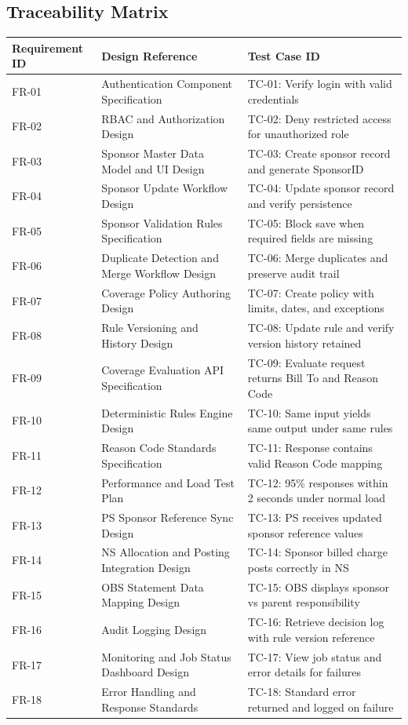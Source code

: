 \documentclass[12pt,a4paper]{article}
\begin{document}
\subsection{Traceability Matrix}
\begin{center}
\begin{tabular}{p{} p{} p{}}
\textbf{Requirement ID} & \textbf{Design Reference} & \textbf{Test Case ID} \\ \hline
FR-01 & Authentication Component Specification & TC-01: Verify login with valid credentials \\
FR-02 & RBAC and Authorization Design & TC-02: Deny restricted access for unauthorized role \\
FR-03 & Sponsor Master Data Model and UI Design & TC-03: Create sponsor record and generate SponsorID \\
FR-04 & Sponsor Update Workflow Design & TC-04: Update sponsor record and verify persistence \\
FR-05 & Sponsor Validation Rules Specification & TC-05: Block save when required fields are missing \\
FR-06 & Duplicate Detection and Merge Workflow Design & TC-06: Merge duplicates and preserve audit trail \\
FR-07 & Coverage Policy Authoring Design & TC-07: Create policy with limits, dates, and exceptions \\
FR-08 & Rule Versioning and History Design & TC-08: Update rule and verify version history retained \\
FR-09 & Coverage Evaluation API Specification & TC-09: Evaluate request returns Bill To and Reason Code \\
FR-10 & Deterministic Rules Engine Design & TC-10: Same input yields same output under same rules \\
FR-11 & Reason Code Standards Specification & TC-11: Response contains valid Reason Code mapping \\
FR-12 & Performance and Load Test Plan & TC-12: 95\% responses within 2 seconds under normal load \\
FR-13 & PS Sponsor Reference Sync Design & TC-13: PS receives updated sponsor reference values \\
FR-14 & NS Allocation and Posting Integration Design & TC-14: Sponsor billed charge posts correctly in NS \\
FR-15 & OBS Statement Data Mapping Design & TC-15: OBS displays sponsor vs parent responsibility \\
FR-16 & Audit Logging Design & TC-16: Retrieve decision log with rule version reference \\
FR-17 & Monitoring and Job Status Dashboard Design & TC-17: View job status and error details for failures \\
FR-18 & Error Handling and Response Standards & TC-18: Standard error returned and logged on failure \\
\end{tabular}
\end{center}
\end{document}
